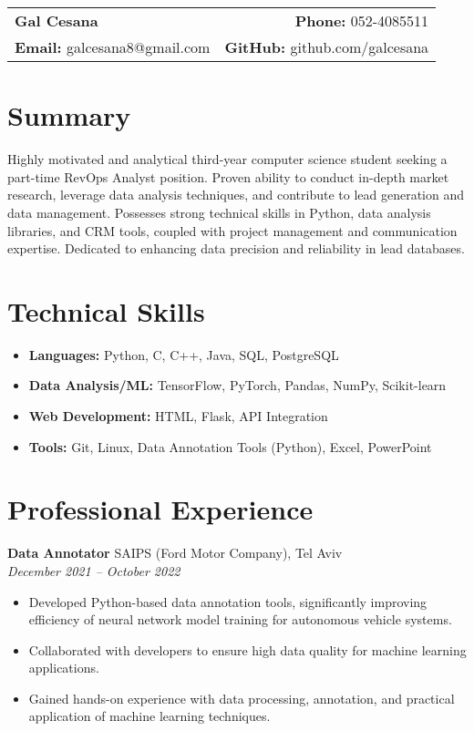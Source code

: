 \documentclass[a4paper,10pt]{article}
\makeatletter
\renewcommand{\maketitle}{
    \hspace{-1em}\begin{tabular*}{\textwidth}{l@{\extracolsep{\fill}}r}
        \textbf{\LARGE Gal Cesana} & \textbf{Phone:} 052-4085511 \\
        \textbf{Email:} galcesana8@gmail.com & \textbf{GitHub:} github.com/galcesana \\
        
    \end{tabular*}
    \vspace{1em}
}
\makeatother
\begin{document}
\maketitle

\section*{Summary}
Highly motivated and analytical third-year computer science student seeking a part-time RevOps Analyst position. Proven ability to conduct in-depth market research, leverage data analysis techniques, and contribute to lead generation and data management. Possesses strong technical skills in Python, data analysis libraries, and CRM tools, coupled with project management and communication expertise.  Dedicated to enhancing data precision and reliability in lead databases.

\section*{Technical Skills}
\begin{itemize}[noitemsep,nolistsep]
    \item \textbf{Languages:} Python, C, C++, Java, SQL, PostgreSQL
    \item \textbf{Data Analysis/ML:} TensorFlow, PyTorch, Pandas, NumPy, Scikit-learn
    \item \textbf{Web Development:} HTML, Flask, API Integration
    \item \textbf{Tools:} Git, Linux, Data Annotation Tools (Python), Excel, PowerPoint
\end{itemize}

\section*{Professional Experience}
\textbf{Data Annotator} \hfill SAIPS (Ford Motor Company), Tel Aviv \\
\textit{December 2021 -- October 2022}
\begin{itemize}[noitemsep,nolistsep]
    \item Developed Python-based data annotation tools, significantly improving efficiency of neural network model training for autonomous vehicle systems.
    \item Collaborated with developers to ensure high data quality for machine learning applications.
    \item Gained hands-on experience with data processing, annotation, and practical application of machine learning techniques.
\end{itemize}
\end{document}
